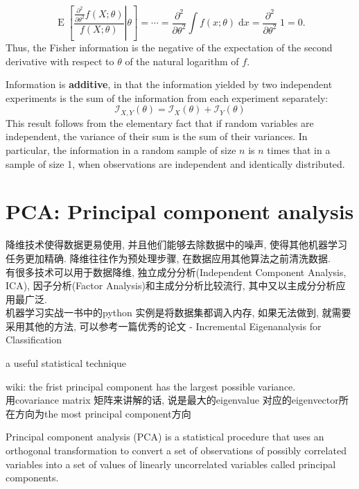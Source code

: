 \documentclass{article}
\begin{document}
$$
\operatorname{E} \left[\left. \frac{\frac{\partial^2}{\partial\theta^2} f(X;\theta)}{f(X; \theta)}\right|\theta \right]
= \cdots
= \frac{\partial^2}{\partial\theta^2} \int f(x; \theta)\; \mathrm{d}x
= \frac{\partial^2}{\partial\theta^2} \; 1
= 0.
$$
Thus, the Fisher information is the negative of the expectation of the second derivative with respect to $\theta$ of the natural logarithm of $f$.

Information is \textbf{additive}, in that the information yielded by two independent experiments is the sum of the information from each experiment separately:
$$ \mathcal{I}_{X,Y}(\theta) = \mathcal{I}_X(\theta) + \mathcal{I}_Y(\theta) $$
This result follows from the elementary fact that if random variables are independent, the variance of their sum is the sum of their variances.
In particular, the information in a random sample of size $n$ is $n$ times that in a sample of size 1,
when observations are independent and identically distributed.

\section{PCA: Principal component analysis}
降维技术使得数据更易使用, 并且他们能够去除数据中的噪声, 使得其他机器学习任务更加精确. 降维往往作为预处理步骤, 在数据应用其他算法之前清洗数据.\\
有很多技术可以用于数据降维, 独立成分分析(Independent Component Analysis, ICA), 因子分析(Factor Analysis)和主成分分析比较流行, 其中又以主成分分析应用最广泛.\\
机器学习实战一书中的python 实例是将数据集都调入内存, 如果无法做到, 就需要采用其他的方法, 可以参考一篇优秀的论文 - Incremental Eigenanalysis for Classification

a useful statistical technique

wiki: the frist principal component has the largest possible variance.\\
\noindent
用covariance matrix 矩阵来讲解的话, 说是最大的eigenvalue 对应的eigenvector所在方向为the most principal component方向\\

Principal component analysis (PCA) is a statistical procedure that uses an orthogonal transformation to convert a set of observations of possibly correlated variables into a set of values of linearly uncorrelated variables called principal components.
\end{document}
